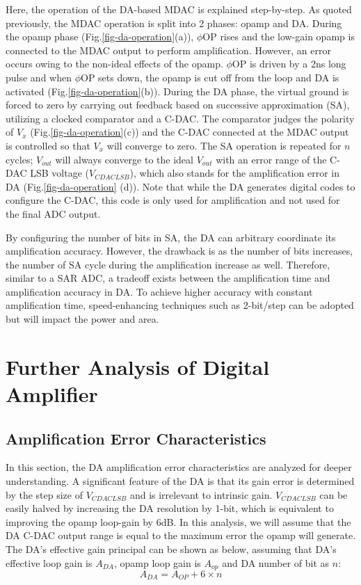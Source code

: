 Here, the operation of the DA-based MDAC is explained step-by-step.
As quoted previously, the MDAC operation is split into 2 phases: opamp and DA.
During the opamp phase (Fig.\ref{fig-da-operation}(a)), $\phi$OP rises and the low-gain opamp is connected to the MDAC output to perform amplification. However, an error occurs owing to the non-ideal effects of the opamp.  
$\phi$OP is driven by a 2ns long pulse and when $\phi$OP sets down, the opamp is cut off from the loop and DA is activated (Fig.\ref{fig-da-operation}(b)). 
During the DA phase, the virtual ground is forced to zero by carrying out feedback based on successive approximation (SA), utilizing a clocked comparator and a C-DAC. The comparator judges the polarity of $V_x$ (Fig.\ref{fig-da-operation}(c)) and the C-DAC connected at the MDAC output is controlled so that $V_x$ will converge to zero. The SA operation is repeated for $n$ cycles; $V_{out}$ will always converge to the ideal $V_{out}$ with an error range of the C-DAC LSB voltage ($V_{CDACLSB}$), which also stands for the amplification error in DA (Fig.\ref{fig-da-operation} (d)). Note that while the DA generates digital codes to configure the C-DAC, this code is only used for amplification and not used for the final ADC output.

By configuring the number of bits in SA, the DA can arbitrary coordinate its amplification accuracy. However, the drawback is as the number of bits increases, the number of SA cycle during the amplification increase as well. Therefore, similar to a SAR ADC, a tradeoff exists between the amplification time and amplification accuracy in DA. To achieve higher accuracy with constant amplification time, speed-enhancing techniques such as 2-bit/step \cite{cao200832mw}\cite{yoshioka20158} can be adopted but will impact the power and area.

\section{Further Analysis of Digital Amplifier}
\subsection{Amplification Error Characteristics}
In this section, the DA amplification error characteristics are analyzed for deeper understanding.
A significant feature of the DA is that its gain error is determined by the step size of $V_{CDACLSB}$ and is irrelevant to intrinsic gain.  $V_{CDACLSB}$ can be easily halved by increasing the DA resolution by 1-bit, which is equivalent to improving the opamp loop-gain by 6dB.
In this analysis, we will assume that the DA C-DAC output range is equal to the maximum error the opamp will generate. 
The DA's effective gain principal can be shown as below, assuming that DA's effective loop gain is $A_{DA}$, opamp loop gain is $A_{op}$ and DA number of bit as $n$: 
\begin{equation}
\label{eq:eq-gain}
A_{DA} = A_{OP}+6 \times n
\end{equation}

